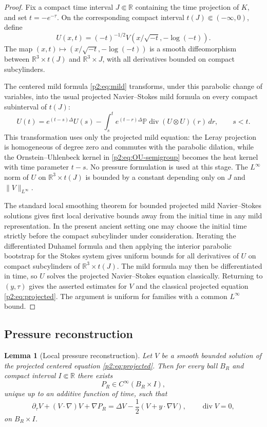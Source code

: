 \documentclass[11pt]{amsart}
\theoremstyle{plain}
\newtheorem{lemma}[lemma]{Lemma}
\theoremstyle{definition}
\theoremstyle{remark}
\numberwithin{equation}{section}
\newcommand{\R}{\mathbb R}
\newcommand{\divergence}{\operatorname{div}}
\begin{document}
\begin{proof}
Fix a compact time interval \(J\Subset\R\) containing the time projection of
\(K\), and set \(t=-e^{-\tau}\).  On the corresponding compact interval
\(t(J)\Subset(-\infty,0)\), define
\[
   U(x,t)=(-t)^{-1/2}V(x/\sqrt{-t},-\log(-t)).
\]
The map \((x,t)\mapsto (x/\sqrt{-t},-\log(-t))\) is a smooth diffeomorphism
between \(\R^3\times t(J)\) and \(\R^3\times J\), with all derivatives bounded
on compact subcylinders.

The centered mild formula \eqref{p2:eq:mild} transforms, under this parabolic
change of variables, into the usual projected Navier--Stokes mild formula on
every compact subinterval of \(t(J)\):
\[
   U(t)=e^{(t-s)\Delta}U(s)
   -
   \int_s^t e^{(t-r)\Delta}\mathbb P\divergence(U\otimes U)(r)\,dr,
   \qquad s<t.
\]
This transformation uses only the projected mild equation: the Leray projection
is homogeneous of degree zero and commutes with the parabolic dilation, while
the Ornstein--Uhlenbeck kernel in \eqref{p2:eq:OU-semigroup} becomes the heat
kernel with time parameter \(t-s\).  No pressure formulation is used at this
stage.  The \(L^\infty\) norm of \(U\) on \(\R^3\times t(J)\) is bounded by a
constant depending only on \(J\) and \(\|V\|_{L^\infty}\).

The standard local smoothing theorem for bounded projected mild
Navier--Stokes solutions \cite{Kato1984,GigaMiyakawa1985} gives first local
derivative bounds away from the initial time in any mild representation.  In
the present ancient setting one may choose the initial time strictly before the
compact subcylinder under consideration.  Iterating the differentiated
Duhamel formula and then applying the interior parabolic bootstrap for the
Stokes system \cite{Ladyzhenskaya1968,Sohr2001} gives uniform bounds for all
derivatives of \(U\) on compact subcylinders of \(\R^3\times t(J)\).  The mild
formula may then be differentiated in time, so \(U\) solves the projected
Navier--Stokes equation classically.  Returning to \((y,\tau)\) gives the
asserted estimates for \(V\) and the classical projected equation
\eqref{p2:eq:projected}.  The argument is uniform for families with a common
\(L^\infty\) bound.
\end{proof}

\subsection{Pressure reconstruction}

\begin{lemma}[Local pressure reconstruction]\label{p2:lem:local-pressure}
Let \(V\) be a smooth bounded solution of the projected centered equation
\eqref{p2:eq:projected}.  Then for every ball \(B_R\) and compact interval
\(I\Subset\R\) there exists
\[
   P_R\in C^\infty(B_R\times I),
\]
unique up to an additive function of time, such that
\[
   \partial_\tau V+(V\cdot\nabla)V+\nabla P_R
   =
   \Delta V-\frac12(V+y\cdot\nabla V),
   \qquad \divergence V=0,
\]
on \(B_R\times I\).
\end{lemma}
\end{document}

